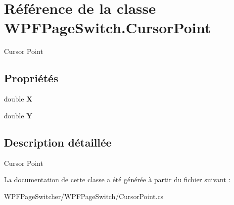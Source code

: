 \hypertarget{class_w_p_f_page_switch_1_1_cursor_point}{\section{Référence de la classe W\+P\+F\+Page\+Switch.\+Cursor\+Point}
\label{class_w_p_f_page_switch_1_1_cursor_point}
}


Cursor Point  


\subsection*{Propriétés}
\begin{DoxyCompactItemize}
\item 
\hypertarget{class_w_p_f_page_switch_1_1_cursor_point_af921ce768aa3273833fdc3e978e9f81e}{double {\bfseries X}}\label{class_w_p_f_page_switch_1_1_cursor_point_af921ce768aa3273833fdc3e978e9f81e}

\item 
\hypertarget{class_w_p_f_page_switch_1_1_cursor_point_a20a949e5e110f776c0a98dd0bc72f0c5}{double {\bfseries Y}}\label{class_w_p_f_page_switch_1_1_cursor_point_a20a949e5e110f776c0a98dd0bc72f0c5}

\end{DoxyCompactItemize}


\subsection{Description détaillée}
Cursor Point 



La documentation de cette classe a été générée à partir du fichier suivant \+:\begin{DoxyCompactItemize}
\item 
W\+P\+F\+Page\+Switcher/\+W\+P\+F\+Page\+Switch/Cursor\+Point.\+cs\end{DoxyCompactItemize}
